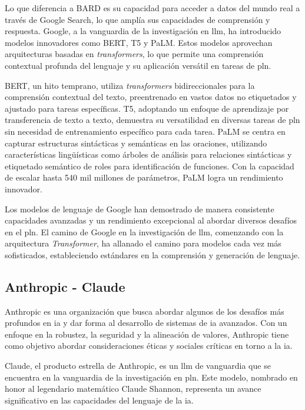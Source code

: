 Lo que diferencia a BARD es su capacidad para acceder a datos del mundo real a través de Google Search, lo que amplía sus capacidades de comprensión y respuesta. Google, a la vanguardia de la investigación en \acrshort{llm}, ha introducido modelos innovadores como BERT, T5 y PaLM. Estos modelos aprovechan arquitecturas basadas en \textit{transformers}, lo que permite una comprensión contextual profunda del lenguaje y su aplicación versátil en tareas de \acrlong{pln}.

BERT, un hito temprano, utiliza \textit{transformers} bidireccionales para la comprensión contextual del texto, preentrenado en vastos datos no etiquetados y ajustado para tareas específicas. T5, adoptando un enfoque de aprendizaje por transferencia de texto a texto, demuestra su versatilidad en diversas tareas de \acrlong{pln} sin necesidad de entrenamiento específico para cada tarea. PaLM se centra en capturar estructuras sintácticas y semánticas en las oraciones, utilizando características lingüísticas como árboles de análisis para relaciones sintácticas y etiquetado semántico de roles para identificación de funciones. Con la capacidad de escalar hasta 540 mil millones de parámetros, PaLM logra un rendimiento innovador.

Los modelos de lenguaje de Google han demostrado de manera consistente capacidades avanzadas y un rendimiento excepcional al abordar diversos desafíos en el \acrshort{pln}. El camino de Google en la investigación de \acrshort{llm}, comenzando con la arquitectura \textit{Transformer}, ha allanado el camino para modelos cada vez más sofisticados, estableciendo estándares en la comprensión y generación de lenguaje.

\subsection{Anthropic - Claude}

Anthropic es una organización que busca abordar algunos de los desafíos más profundos en \acrlong{ia} y dar forma al desarrollo de sistemas de \acrshort{ia} avanzados. Con un enfoque en la robustez, la seguridad y la alineación de valores, Anthropic tiene como objetivo abordar consideraciones éticas y sociales críticas en torno a la \acrshort{ia}.

Claude, el producto estrella de Anthropic, es un \acrlong{llm} de vanguardia que se encuentra en la vanguardia de la investigación en \acrlong{pln}. Este modelo, nombrado en honor al legendario matemático Claude Shannon, representa un avance significativo en las capacidades del lenguaje de la \acrshort{ia}. 

